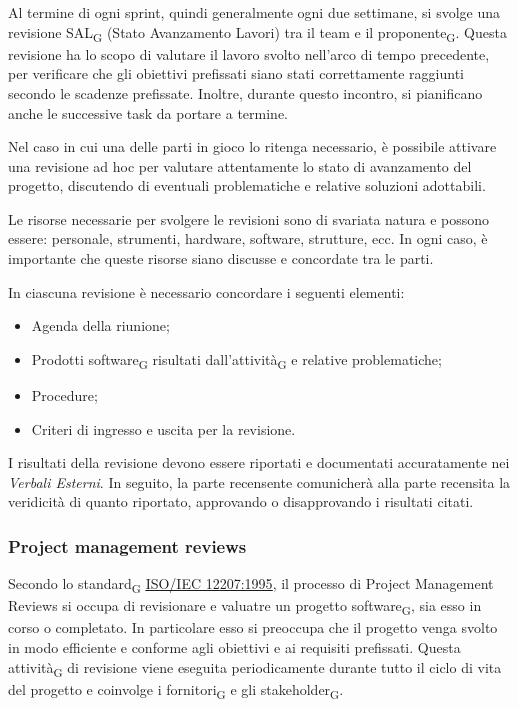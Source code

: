 Al termine di ogni sprint, quindi generalmente ogni due settimane, si svolge una revisione {SAL\textsubscript{G}}
(Stato Avanzamento Lavori) tra il team e il {proponente\textsubscript{G}}. Questa revisione ha lo scopo di valutare il lavoro svolto
nell'arco di tempo precedente, per verificare che gli obiettivi prefissati siano stati correttamente raggiunti secondo le scadenze prefissate.
Inoltre, durante questo incontro, si pianificano anche le successive task da portare a termine.

Nel caso in cui una delle parti in gioco lo ritenga necessario, è possibile attivare una revisione ad hoc per valutare attentamente lo stato
di avanzamento del progetto, discutendo di eventuali problematiche e relative soluzioni adottabili.

Le risorse necessarie per svolgere le revisioni sono di svariata natura e possono essere: personale, strumenti, hardware, software, strutture, ecc.
In ogni caso, è importante che queste risorse siano discusse e concordate tra le parti.

In ciascuna revisione è necessario concordare i seguenti elementi:
\begin{itemize}
    \item Agenda della riunione;
    \item Prodotti {software\textsubscript{G}} risultati dall'{attività\textsubscript{G}} e relative problematiche;
    \item Procedure;
    \item Criteri di ingresso e uscita per la revisione.
\end{itemize}

I risultati della revisione devono essere riportati e documentati accuratamente nei \textit{Verbali Esterni}. In seguito, la parte recensente
comunicherà alla parte recensita la veridicità di quanto riportato, approvando o disapprovando i risultati citati.

\subsubsection{Project management reviews}
Secondo lo {standard\textsubscript{G}} \href{https://www.math.unipd.it/~tullio/IS-1/2009/Approfondimenti/ISO_12207-1995.pdf}{\underline{ISO/IEC 12207:1995}},
il processo di Project Management Reviews si occupa di revisionare e valuatre un progetto {software\textsubscript{G}}, sia esso
in corso o completato. In particolare esso si preoccupa che il progetto venga svolto in modo efficiente e conforme agli obiettivi e ai requisiti 
prefissati. Questa {attività\textsubscript{G}} di revisione viene eseguita periodicamente durante tutto il ciclo di vita del progetto e
coinvolge i {fornitori\textsubscript{G}} e gli {stakeholder\textsubscript{G}}.

